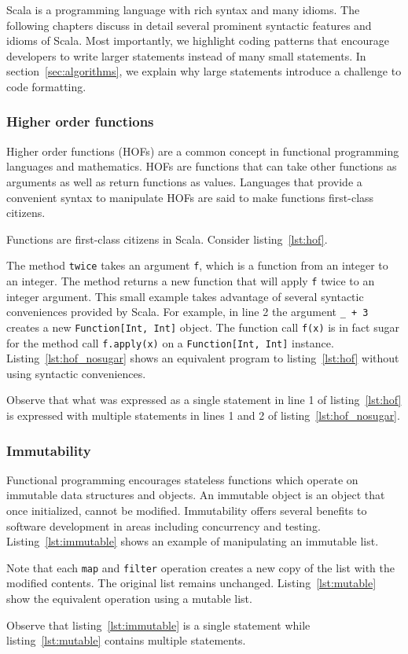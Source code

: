 Scala is a programming language with rich syntax and many idioms.
The following chapters discuss in detail several prominent syntactic features and idioms of Scala.
Most importantly, we highlight coding patterns that encourage developers to write larger statements instead of many small statements.
In section~\ref{sec:algorithms}, we explain why large statements introduce a challenge to code formatting.

\subsubsection{Higher order functions}
Higher order functions (HOFs) are a common concept in functional programming languages and mathematics.
HOFs are functions that can take other functions as arguments as well as return functions as values.
Languages that provide a convenient syntax to manipulate HOFs are said to make functions first-class citizens.

Functions are first-class citizens in Scala.
Consider listing~\ref{lst:hof}.

The method \texttt{twice} takes an argument \texttt{f}, which is a function from an integer to an integer.
The method returns a new function that will apply \texttt{f} twice to an integer argument.
This small example takes advantage of several syntactic conveniences provided by Scala.
For example, in line 2 the argument \texttt{\_ + 3} creates a new \texttt{Function[Int, Int]} object.
The function call \texttt{f(x)} is in fact sugar for the method call \texttt{f.apply(x)} on a \texttt{Function[Int, Int]} instance.
Listing~\ref{lst:hof_nosugar} shows an equivalent program to listing~\ref{lst:hof} without using syntactic conveniences.

Observe that what was expressed as a single statement in line 1 of listing~\ref{lst:hof} is expressed with multiple statements in lines 1 and 2 of listing~\ref{lst:hof_nosugar}.

\subsubsection{Immutability}
Functional programming encourages stateless functions which operate on immutable data structures and objects.
An immutable object is an object that once initialized, cannot be modified.
Immutability offers several benefits to software development in areas including concurrency and testing.
Listing~\ref{lst:immutable} shows an example of manipulating an immutable list.

Note that each \texttt{map} and \texttt{filter} operation creates a new copy of the list with the modified contents.
The original list remains unchanged.
Listing~\ref{lst:mutable} show the equivalent operation using a mutable list.

Observe that listing~\ref{lst:immutable} is a single statement while listing~\ref{lst:mutable} contains multiple statements.

